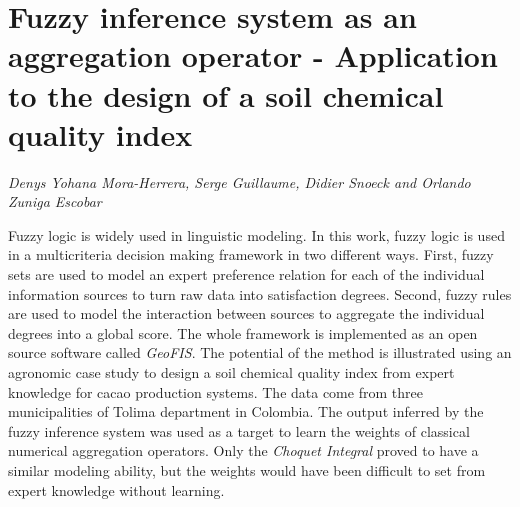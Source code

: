 \documentclass[../booklet.tex]{subfiles}
\begin{document}
\section[Fuzzy inference system as an aggregation operator -    Application to the design of a soil chemical quality index. {\it Denys Yohana Mora-Herrera, Serge Guillaume, Didier Snoeck and Orlando Zuniga Escobar}]{Fuzzy inference system as an aggregation operator -    Application to the design of a soil chemical quality index}
   

\begin{center}
  {\it Denys Yohana Mora-Herrera, Serge Guillaume, Didier Snoeck and Orlando Zuniga Escobar}
\end{center}

\vskip 0.8cm


  Fuzzy logic is widely used in linguistic modeling. In this work, fuzzy logic is used in a multicriteria decision making framework in two different ways. First, fuzzy sets are used to model an expert preference relation for each of the individual information sources to turn raw data into satisfaction degrees. Second, fuzzy rules are used to model the interaction between sources to aggregate the individual degrees into a global score. The whole framework is implemented as an open source software called \textit{GeoFIS}. The potential of the method is illustrated using an agronomic case study to design a soil chemical quality index from expert knowledge for cacao production systems. The data come from three municipalities of Tolima department in Colombia. The output inferred by the fuzzy inference system was used as a target to learn the weights of classical numerical aggregation operators. Only the \textit{Choquet Integral} proved to have a similar modeling ability, but the weights would have been difficult to set from expert knowledge without learning.
  
\end{document}
